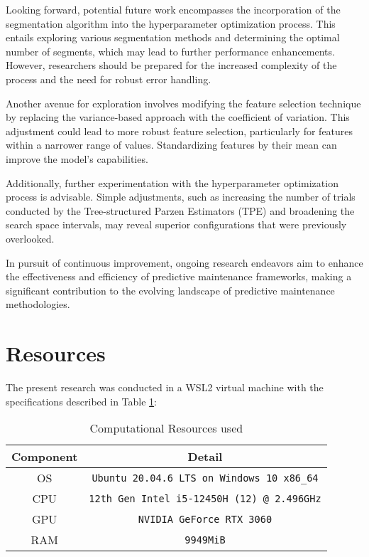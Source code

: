 \documentclass{IEEEtran}
\begin{document}
        Looking forward, potential future work encompasses the incorporation of the segmentation algorithm into the hyperparameter optimization process. This entails exploring various segmentation methods and determining the optimal number of segments, which may lead to further performance enhancements. However, researchers should be prepared for the increased complexity of the process and the need for robust error handling.

        Another avenue for exploration involves modifying the feature selection technique by replacing the variance-based approach with the coefficient of variation. This adjustment could lead to more robust feature selection, particularly for features within a narrower range of values. Standardizing features by their mean can improve the model's capabilities.

        Additionally, further experimentation with the hyperparameter optimization process is advisable. Simple adjustments, such as increasing the number of trials conducted by the Tree-structured Parzen Estimators (TPE) and broadening the search space intervals, may reveal superior configurations that were previously overlooked.

        In pursuit of continuous improvement, ongoing research endeavors aim to enhance the effectiveness and efficiency of predictive maintenance frameworks, making a significant contribution to the evolving landscape of predictive maintenance methodologies.

    \section{Resources} \label{sec:resources}

        The present research was conducted in a WSL2 virtual machine with the specifications described in Table \ref{tab:resources}:
        \begin{table}[!htbp]
            \centering
            \caption{Computational Resources used}
            \label{tab:resources}
            \begin{tabular}{cc}
                \toprule
                Component & Detail \\
                \midrule
                OS & \texttt{Ubuntu 20.04.6 LTS on Windows 10 x86\_64} \\
                CPU & \texttt{12th Gen Intel i5-12450H (12) @ 2.496GHz} \\
                GPU & \texttt{NVIDIA GeForce RTX 3060} \\
                RAM & \texttt{9949MiB} \\
                \bottomrule
            \end{tabular}
        \end{table}
\end{document}
